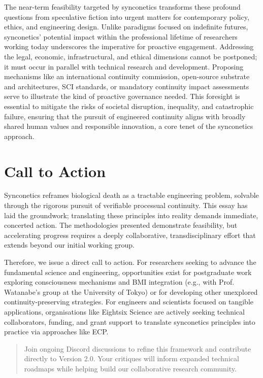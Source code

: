 \documentclass[10pt]{article}
\begin{document}
\begin{sloppypar}
  The near-term feasibility targeted by synconetics transforms these profound questions from speculative fiction into urgent matters for contemporary policy, ethics, and engineering design. Unlike paradigms focused on indefinite futures, synconetics’ potential impact within the professional lifetime of researchers working today underscores the imperative for proactive engagement. Addressing the legal, economic, infrastructural, and ethical dimensions cannot be postponed; it must occur in parallel with technical research and development. Proposing mechanisms like an international continuity commission, open-source substrate and architectures, SCI standards, or mandatory continuity impact assessments serve to illustrate the kind of proactive governance needed. This foresight is essential to mitigate the risks of societal disruption, inequality, and catastrophic failure, ensuring that the pursuit of engineered continuity aligns with broadly shared human values and responsible innovation, a core tenet of the synconetics approach.


  \section{Call to Action}
  \label{sec:call-to-action}

  Synconetics reframes biological death as a tractable engineering problem, solvable through the rigorous pursuit of verifiable processual continuity. This essay has laid the groundwork; translating these principles into reality demands immediate, concerted action. The methodologies presented demonstrate feasibility, but accelerating progress requires a deeply collaborative, transdisciplinary effort that extends beyond our initial working group.

  Therefore, we issue a direct call to action. For researchers seeking to advance the fundamental science and engineering, opportunities exist for postgraduate work exploring consciousness mechanisms and BMI integration (e.g., with Prof. Watanabe’s group at the University of Tokyo) or for developing other unexplored continuity-preserving strategies. For engineers and scientists focused on tangible applications, organisations like Eightsix Science are actively seeking technical collaborators, funding, and grant support to translate synconetics principles into practice via approaches like ECP.

  \begin{quote}
    Join ongoing Discord discussions to refine this framework and contribute directly to Version 2.0. Your critiques will inform expanded technical roadmaps while helping build our collaborative research community.
  \end{quote}


\end{sloppypar}
\end{document}

